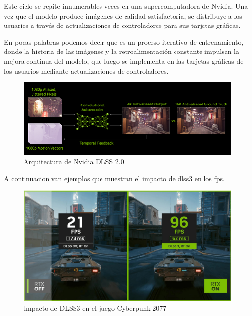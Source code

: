\documentclass[runningheads]{llncs} %
\begin{document}
Este ciclo se repite innumerables veces en una supercomputadora de Nvidia. 
Una vez que el modelo produce imágenes de calidad satisfactoria, 
se distribuye a los usuarios a través de actualizaciones de controladores 
para sus tarjetas gráficas. \cite{ej-dlss2}

En pocas palabras podemos decir que es un proceso iterativo de entrenamiento, 
donde la historia de las imágenes y la retroalimentación constante impulsan 
la mejora continua del modelo, que luego se implementa en las tarjetas gráficas 
de los usuarios mediante actualizaciones de controladores. 

\begin{figure}
    \centering
    \includegraphics[scale=0.4]{dlss.jpg}
    \caption{Arquitectura de Nvidia DLSS 2.0 \cite{ej-dlss2}}
    \label{fig:arquitectura-dlss}
\end{figure}

A continuacion van ejemplos que muestran el impacto de dlss3 en los fps.

\begin{figure}
    \centering
    \includegraphics[scale=0.2]{ej1-dlss3.jpg}
    \caption{Impacto de DLSS3 en el juego Cyberpunk 2077 \cite{img1-dlss3}}
    \label{fig:ej1-dlss3}
\end{figure}
\end{document}
